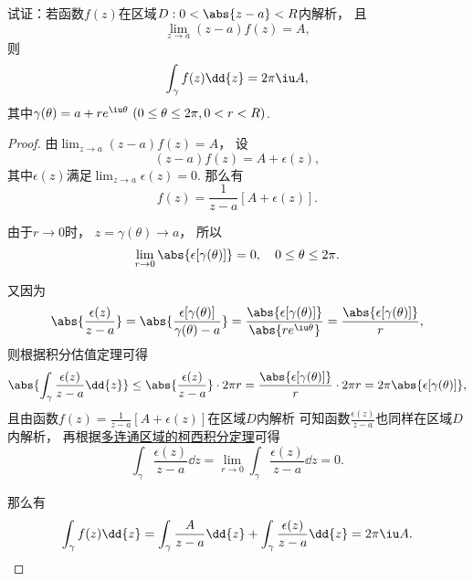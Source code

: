 \begin{example}%
试证：若函数\(f(z)\)在区域\(D: 0<\abs{z-a}<R\)内解析，
且\[
	\lim_{z \to a}(z-a)f(z)=A,
\]
则\[
	\int_\gamma f(z) \dd{z} = 2\pi\iu A,
\]
其中\(\gamma(\theta) = a+re^{\iu\theta}\ (0 \leq \theta \leq 2\pi, 0 < r < R)\).
\begin{proof}
由\(\lim_{z \to a}(z-a)f(z) = A\)，
设\[
	(z-a)f(z) = A + \epsilon(z),
\]
其中\(\epsilon(z)\)满足\(\lim_{z \to a} \epsilon(z) = 0\).
那么有\[
	f(z) = \frac{1}{z-a}[A+\epsilon(z)].
\]

由于\(r\to0\)时，
\(z=\gamma(\theta) \to a\)，
所以\[
	\lim_{r\to0} \abs{\epsilon[\gamma(\theta)]} = 0,
	\quad 0 \leq \theta \leq 2\pi.
\]

又因为\[
	\abs{\frac{\epsilon(z)}{z-a}}
	= \abs{\frac{\epsilon[\gamma(\theta)]}{\gamma(\theta)-a}}
	= \frac{\abs{\epsilon[\gamma(\theta)]}}{\abs{re^{\iu\theta}}}
	= \frac{\abs{\epsilon[\gamma(\theta)]}}{r},
\]
则根据积分估值定理可得\[
	\abs{\int_\gamma \frac{\epsilon(z)}{z-a} \dd{z}}
	\leq \abs{\frac{\epsilon(z)}{z-a}} \cdot 2\pi r
	= \frac{\abs{\epsilon[\gamma(\theta)]}}{r} \cdot 2\pi r
	= 2\pi \abs{\epsilon[\gamma(\theta)]},
\]
且由函数\(f(z) = \frac{1}{z-a}[A+\epsilon(z)]\)在区域\(D\)内解析
可知函数\(\frac{\epsilon(z)}{z-a}\)也同样在区域\(D\)内解析，
再根据\hyperref[theorem:解析函数的积分表示.多连通区域的柯西积分定理]{多连通区域的柯西积分定理}可得\[
	\int_\gamma \frac{\epsilon(z)}{z-a} \dd{z}
	= \lim_{r\to0} \int_\gamma \frac{\epsilon(z)}{z-a} \dd{z}
	= 0.
\]

那么有\[
	\int_\gamma f(z) \dd{z}
	= \int_\gamma \frac{A}{z-a} \dd{z}
	+ \int_\gamma \frac{\epsilon(z)}{z-a} \dd{z}
	= 2\pi\iu A.
	\qedhere
\]
\end{proof}
\end{example}

